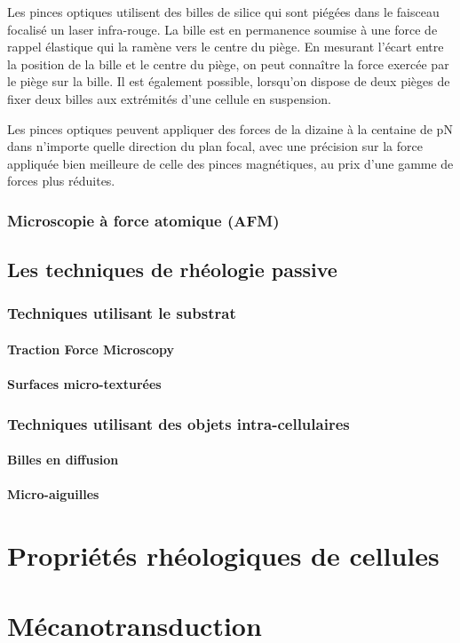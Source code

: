 \documentclass{report}
\begin{document}
Les pinces optiques utilisent des billes de silice qui sont piégées dans le faisceau focalisé un laser infra-rouge. 
La bille est en permanence soumise à une force de rappel élastique qui la ramène vers le centre du piège. 
En mesurant l'écart entre la position de la bille et le centre du piège, on peut connaître la force exercée par le piège sur la bille. 
Il est également possible, lorsqu'on dispose de deux pièges de fixer deux billes aux extrémités d'une cellule en suspension. 

Les pinces optiques peuvent appliquer des forces de la dizaine à la centaine de pN dans n'importe quelle direction du plan focal, avec une précision sur la force appliquée bien meilleure de celle des pinces magnétiques, au prix d'une gamme de forces plus réduites. 

\subsubsection{Microscopie à force atomique (AFM)}



\subsection{Les techniques de rhéologie passive}
\subsubsection{Techniques utilisant le substrat}
\paragraph{Traction Force Microscopy}
\paragraph{Surfaces micro-texturées}
\subsubsection{Techniques utilisant des objets intra-cellulaires}
\paragraph{Billes en diffusion}
\paragraph{Micro-aiguilles}


\section{Propriétés rhéologiques de cellules}

\section{Mécanotransduction}
\end{document}
